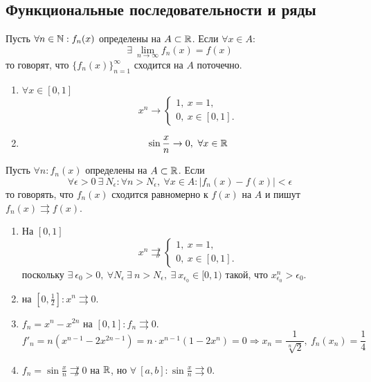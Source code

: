\subsection{Функциональные последовательности и ряды}
\begin{definition}
    Пусть $\forall n\in \mathbb{N}: f_n(x)$ определены на $A\subset \mathbb{R}$. Если $\forall x\in A$: 
    \[\exists\ \lim\limits_{n\to\infty}f_n(x)=f(x)\]
    то говорят, что $\{f_n(x)\}_{n=1}^{\infty}$ сходится на $A$ поточечно.
\end{definition}
\begin{examples}\tab
    \begin{enumerate}
        \item $\forall x\in[0,1]$
        \[x^n\to \begin{cases}
            1,\ x=1,\\
            0,\ x\in [0,1].
        \end{cases}\]
        \item 
        \[\sin{\frac{x}{n}}\to 0,\ \forall x\in \mathbb{R}\]
    \end{enumerate}
\end{examples}
\begin{definition}
    Пусть $\forall n: f_n(x)$ определены на $A\subset \mathbb{R}$. Если 
    \[\forall \epsilon>0\ \exists\ N_{\epsilon}: \forall n>N_{\epsilon},\ \forall x\in A: |f_n(x)-f(x)|<\epsilon\]
    то говорять, что $f_n(x)$ сходится равномерно к $f(x)$ на $A$ и пишут $f_n(x)\rightrightarrows f(x)$.
\end{definition}
\begin{examples}\tab
    \begin{enumerate}
        \item На $[0,1]$
        \[x^n \not\rightrightarrows \begin{cases}
            1,\ x=1,\\
            0,\ x\in [0,1].
        \end{cases} \]
        поскольку $\exists\ \epsilon_0>0,\ \forall N_{\epsilon}\ \exists\ n>N_{\epsilon},\ \exists\ x_{\epsilon_0}\in [0,1)$ такой, что $x_{\epsilon_0}^n>\epsilon_0$.
        \item на $[0,\frac{1}{2}]: x^n\rightrightarrows 0$.
        \item $f_n=x^n-x^{2n}$ на $[0,1]: f_n\rightrightarrows 0$.
        \[f'_n=n(x^{n-1}-2x^{2n-1})=n\cdot x^{n-1}(1-2x^n)=0 \Rightarrow x_n=\frac{1}{\sqrt[n]{2}},\ f_n(x_n)=\frac{1}{4}\]
        \item $f_n=\sin{\frac{x}{n}} \not\rightrightarrows 0$ на $\mathbb{R}$, но $\forall\ [a,b]: \sin{\frac{x}{n}}\rightrightarrows 0$.
    \end{enumerate}
\end{examples}
